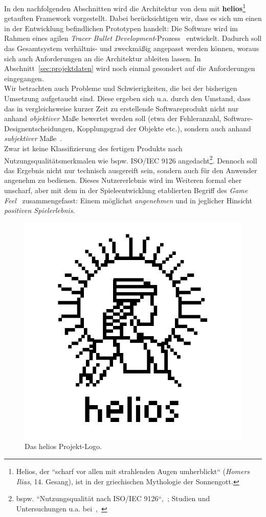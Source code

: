 In den nachfolgenden Abschnitten wird die Architektur von dem mit \textbf{helios}\footnote{
    Helios, der ``scharf vor allen mit strahlenden Augen umherblickt`` (\textit{Homers Ilias}, 14. Gesang), ist in der griechischen Mythologie der Sonnengott.
} getauften Framework vorgestellt.
Dabei berücksichtigen wir, dass es sich um einen in der Entwicklung befindlichen Prototypen handelt:
Die Software wird im Rahmen eines agilen \textit{Tracer Bullet Development}-Prozess~\cite[50 f.]{TH20} entwickelt.
Dadurch soll das Gesamtsystem verhältnis- und zweckmäßig angepasst werden können, woraus sich auch Anforderungen an die Architektur ableiten lassen.
In Abschnitt~\ref{sec:projektdaten} wird noch einmal gesondert auf die Anforderungen eingegangen. \\


Wir betrachten auch Probleme und Schwierigkeiten, die bei der bisherigen Umsetzung aufgetaucht sind.
Diese ergeben sich u.a. durch den Umstand, dass das in vergleichsweise kurzer Zeit zu erstellende Softwareprodukt nicht nur anhand \textit{objektiver} Maße bewertet werden soll (etwa der Fehleranzahl, Software-Designentscheidungen, Kopplungsgrad der Objekte etc.), sondern auch anhand \textit{subjektiver} Maße~\cite[385]{Bal08}.\\
Zwar ist keine Klassifizierung des fertigen Produkts nach Nutzungsqualitätsmerkmalen wie bspw. ISO/IEC 9126 angedacht\footnote{bspw. ``Nutzungsqualität nach ISO/IEC 9126``,~\cite[466]{Bal08}; Studien und Untersuchungen u.a. bei~\cite[]{AZMK17},~\cite[]{Ber10}}.
Dennoch soll das Ergebnis nicht nur technisch ausgereift sein, sondern auch für den Anwender angenehm zu bedienen.
Dieses Nutzererlebnis wird im Weiteren formal eher unscharf, aber mit dem in der Spieleentwicklung etablierten Begriff des \textit{Game Feel}~\cite[]{Swi08} zusammengefasst: Einem möglichst \textit{angenehmen} und in jeglicher Hinsicht \textit{positiven Spielerlebnis}.

\begin{figure}[!h]
    \centering
    \includegraphics[width=0.5\columnwidth]{img/helios_logo}
    \caption{Das helios Projekt-Logo.}
    \label{fig:helios_logo}
\end{figure}
